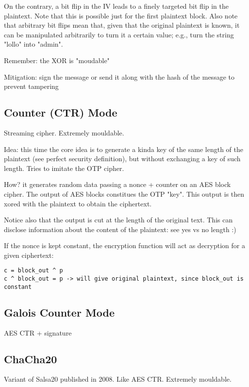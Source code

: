 On the contrary, a bit flip in the IV leads to a finely targeted bit flip in the plaintext.
Note that this is possible just for the first plaintext block.
Also note that arbitrary bit flips mean that, given that the original plaintext is known, it can be manipulated arbitrarily to turn it a certain value; e.g., turn the string "lollo" into "admin".

Remember: the XOR is "moudable"

Mitigation: sign the message or send it along with the hash of the message to prevent tampering

\subsection{Counter (CTR) Mode}
Streaming cipher. Extremely mouldable.

Idea: this time the core idea is to generate a kinda key of the same length of the plaintext (see perfect security definition), but without exchanging a key of such length.
Tries to imitate the OTP cipher.

How? it generates random data passing a nonce + counter on an AES block cipher. The output of AES blocks constitues the OTP "key".
This output is then xored with the plaintext to obtain the ciphertext.

Notice also that the output is cut at the length of the original text. This can disclose information about the content of the plaintext: see yes vs no length :)

If the nonce is kept constant, the encryption function will act as decryption for a given ciphertext:
\begin{verbatim}
c = block_out ^ p
c ^ block_out = p -> will give original plaintext, since block_out is constant
\end{verbatim}

\subsection{Galois Counter Mode}
AES CTR + signature

\subsection{ChaCha20}
Variant of Salsa20 published in 2008. Like AES CTR. Extremely mouldable.
